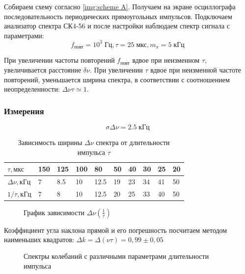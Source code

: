 \documentclass[a4paper, 12pt]{article}
\begin{document}
Собираем схему согласно \ref{img:scheme A}. Получаем на экране осциллографа последовательность периодических прямоугольных импульсов. Подключаем анализатор спектра СК4-56 и после настройки наблюдаем спектр сигнала с параметрами: $$f_\text{повт} = 10^3 \; \text{Гц}, \tau = 25 \; \text{мкс}, m_x = 5 \; \text{кГц}$$

При увеличении частоты повторений $f_\text{повт}$ вдвое при неизменном $\tau$, увеличивается расстояние $\delta \nu$. При увеличении $\tau$ вдвое при неизменной частоте повторений, уменьшается ширина спектра, в соответствии с соотношением неопределенности: $\Delta \nu \tau \simeq 1$.

\subsubsection*{Измерения}
$$\sigma \Delta \nu = 2.5 \; \text{кГц}$$
\begin{table}[H]
\centering
\begin{tabular}{|l|l|l|l|l|l|l|l|l|l|}
\hline
\textbf{$\tau, \text{мкс}$}       & 150          & 125 & 100 & 80   & 50 & 40 & 30            & 25 & 20 \\ \hline
\textbf{$\Delta \nu, \text{кГц}$} & 7            & 8.5 & 10  & 12.5 & 19 & 23 & 34            & 41 & 50 \\ \hline
\textbf{$1/\tau, \text{кГц}$}     & 7 & 8   & 10  & 12.5 & 20 & 25 & 33 & 40 & 50 \\ \hline
\end{tabular}
\caption{Зависимость ширины $\Delta \nu$ спектра  от длительности импульса $\tau$}
\label{my-label}
\end{table}


\begin {figure}[H]
\begin{center}
{}
\caption{График зависимости $\Delta \nu (\frac{1}{\tau})$}
\end{center}
\end{figure}


Коэффициент угла наклона прямой и его погрешность посчитаем методом наименьших квадратов: $\Delta k = \Delta(\nu \tau) = 0,99 \pm 0,05$

\begin{figure}[H]
\begin{minipage}[h]{0.49\linewidth}
\end{minipage}
\hfill
\begin{minipage}[h]{0.49\linewidth}
\end{minipage}
\caption{Спектры колебаний с различными параметрами длительности импульса}
\label{ris:image1}
\end{figure}
\end{document}
